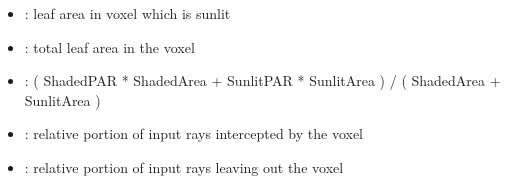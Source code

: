 \documentclass[letterpaper,10pt,english]{sphinxmanual}
\begin{document}
\begin{itemize}
\item {} 
\sphinxAtStartPar
{}: leaf area in voxel which is sunlit

\item {} 
\sphinxAtStartPar
{}: total leaf area in the voxel

\item {} 
\sphinxAtStartPar
{}: ( ShadedPAR * ShadedArea + SunlitPAR * SunlitArea ) / ( ShadedArea + SunlitArea )

\item {} 
\sphinxAtStartPar
{}: relative portion of input rays intercepted by the voxel

\item {} 
\sphinxAtStartPar
{}: relative portion of input rays leaving out the voxel

\end{itemize}
\end{document}
